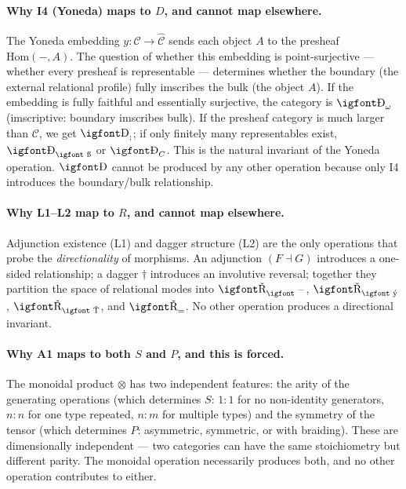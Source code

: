 \documentclass[12pt,a4paper]{article}
\newcommand{\igprimfont}{\igfont\upshape}
\begin{document}
\paragraph{Why I4 (Yoneda) maps to $D$, and cannot map elsewhere.}
The Yoneda embedding $y: \mathcal{C} \to \hat{\mathcal{C}}$ sends each object $A$ to the presheaf $\text{Hom}(-,A)$. The question of whether this embedding is point-surjective --- whether every presheaf is representable --- determines whether the boundary (the external relational profile) fully imscribes the bulk (the object $A$). If the embedding is fully faithful and essentially surjective, the category is $\text{{\igprimfont Ð}}_{\omega}$ (imscriptive: boundary imscribes bulk). If the presheaf category is much larger than $\mathcal{C}$, we get $\text{{\igprimfont Ð}}_{;}$; if only finitely many representables exist, $\text{{\igprimfont Ð}}_{\text{{\igfont ß}}}$ or $\text{{\igprimfont Ð}}_{C}$. This is the natural invariant of the Yoneda operation. $\text{{\igprimfont Ð}}$ cannot be produced by any other operation because only I4 introduces the boundary/bulk relationship.

\paragraph{Why L1--L2 map to $R$, and cannot map elsewhere.}
Adjunction existence (L1) and dagger structure (L2) are the only operations that probe the \emph{directionality} of morphisms. An adjunction $(F \dashv G)$ introduces a one-sided relationship; a dagger $\dagger$ introduces an involutive reversal; together they partition the space of relational modes into $\text{{\igprimfont Ř}}_{\text{{\igfont ¯}}}$, $\text{{\igprimfont Ř}}_{\text{{\igfont ý}}}$, $\text{{\igprimfont Ř}}_{\text{{\igfont Ť}}}$, and $\text{{\igprimfont Ř}}_{=}$. No other operation produces a directional invariant.

\paragraph{Why A1 maps to both $S$ and $P$, and this is forced.}
The monoidal product $\otimes$ has two independent features: the arity of the generating operations (which determines $S$: $1{:}1$ for no non-identity generators, $n{:}n$ for one type repeated, $n{:}m$ for multiple types) and the symmetry of the tensor (which determines $P$: asymmetric, symmetric, or with braiding). These are dimensionally independent --- two categories can have the same stoichiometry but different parity. The monoidal operation necessarily produces both, and no other operation contributes to either.
\end{document}
